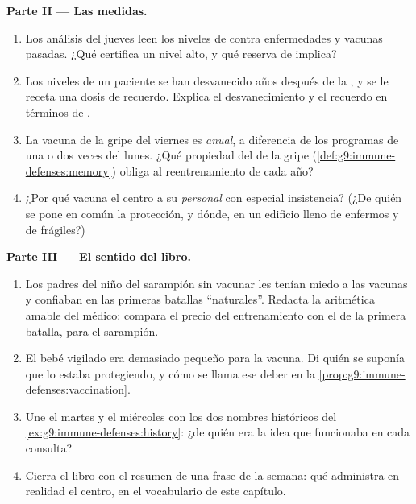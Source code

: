 \begin{problem}
\medskip\noindent\textbf{Parte II --- Las medidas.}
\begin{enumerate}[resume]
  \item Los análisis del jueves leen los niveles de  contra
        enfermedades y vacunas pasadas. ¿Qué certifica un nivel alto, y
        qué reserva de  implica?
  \item Los niveles de un paciente se han desvanecido años después de
        la , y se le receta una dosis de recuerdo. Explica el
        desvanecimiento y el recuerdo en términos de .
  \item La vacuna de la gripe del viernes es \emph{anual}, a
        diferencia de los programas de una o dos veces del lunes. ¿Qué
        propiedad del  de la gripe
        (\cref{def:g9:immune-defenses:memory}) obliga al reentrenamiento
        de cada año?
  \item ¿Por qué vacuna el centro a su \emph{personal} con especial
        insistencia? (¿De quién se pone en común la protección, y
        dónde, en un edificio lleno de enfermos y de frágiles?)
\end{enumerate}

\medskip\noindent\textbf{Parte III --- El sentido del
libro.}
\begin{enumerate}[resume]
  \item Los padres del niño del sarampión sin vacunar les tenían miedo
        a las vacunas y confiaban en las primeras batallas
        ``naturales''. Redacta la aritmética amable del médico: compara
        el precio del entrenamiento con el de la primera batalla, para
        el sarampión.
  \item El bebé vigilado era demasiado pequeño para la vacuna. Di quién
        se suponía que lo estaba protegiendo, y cómo se llama ese deber
        en la \cref{prop:g9:immune-defenses:vaccination}.
  \item Une el martes y el miércoles con los dos nombres históricos del
        \cref{ex:g9:immune-defenses:history}: ¿de quién era la idea que
        funcionaba en cada consulta?
  \item Cierra el libro con el resumen de una frase de la semana: qué
        administra en realidad el centro, en el vocabulario de este
        capítulo.
\end{enumerate}
\end{problem}
